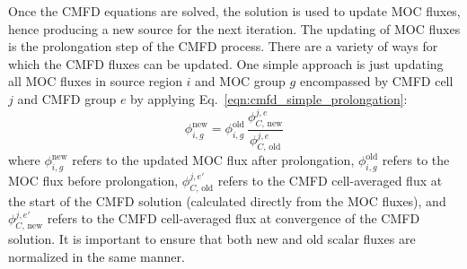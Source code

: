 Once the \ac{CMFD} equations are solved, the solution is used to update \ac{MOC} fluxes, hence producing a new source for the next iteration. The updating of \ac{MOC} fluxes is the prolongation step of the \ac{CMFD} process. There are a variety of ways for which the \ac{CMFD} fluxes can be updated. One simple approach is just updating all \ac{MOC} fluxes in source region $i$ and \ac{MOC} group $g$ encompassed by \ac{CMFD} cell $j$ and \ac{CMFD} group $e$ by applying Eq.~\ref{eqn:cmfd_simple_prolongation}:
\begin{equation}
\phi_{i,g}^{\text{new}} = \phi_{i,g}^{\text{old}} \, \frac{\phi_{C, \, \text{new}}^{j,e}}{\phi_{C, \, \text{old}}^{j,e}}
\label{eqn:cmfd_simple_prolongation}
\end{equation}
where $\phi_{i,g}^{\text{new}}$ refers to the updated \ac{MOC} flux after prolongation, $\phi_{i,g}^{\text{old}}$ refers to the \ac{MOC} flux before prolongation, $\phi_{C, \, \text{old}}^{j,e'}$ refers to the \ac{CMFD} cell-averaged flux at the start of the \ac{CMFD} solution (calculated directly from the \ac{MOC} fluxes), and $\phi_{C, \, \text{new}}^{j,e'}$ refers to the \ac{CMFD} cell-averaged flux at convergence of the \ac{CMFD} solution. It is important to ensure that both new and old scalar fluxes are normalized in the same manner.

